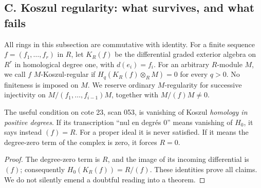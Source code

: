 \subsection{C. Koszul regularity: what survives, and what fails}

All rings in this subsection are commutative with identity.  For a finite
sequence $f=(f_1,\ldots,f_r)$ in $R$, let $K_R(f)$ be the differential
graded exterior algebra on $R^r$ in homological degree one, with
$d(e_i)=f_i$.  For an arbitrary $R$-module $M$, we call $f$
$M$-Koszul-regular if $H_q(K_R(f)\otimes_R M)=0$ for every $q>0$.
No finiteness is imposed on $M$.  We reserve ordinary $M$-regularity for
successive injectivity on $M/(f_1,\ldots,f_{i-1})M$, together with
$M/(f)M\ne0$.

\begin{proposition}\label{SA23-C-1}
The useful condition on cote 23, scan 053, is vanishing of Koszul
\emph{homology in positive degrees}.  If its transcription ``nul en
degr\'es $0$'' means vanishing of $H_0$, it says instead $(f)=R$.
For a proper ideal it is never satisfied.  If it means the degree-zero
term of the complex is zero, it forces $R=0$.
\end{proposition}
\begin{proof}
The degree-zero term is $R$, and the image of its incoming differential
is $(f)$; consequently $H_0(K_R(f))=R/(f)$.  These identities prove all
claims.  We do not silently emend a doubtful reading into a theorem.
\end{proof}

